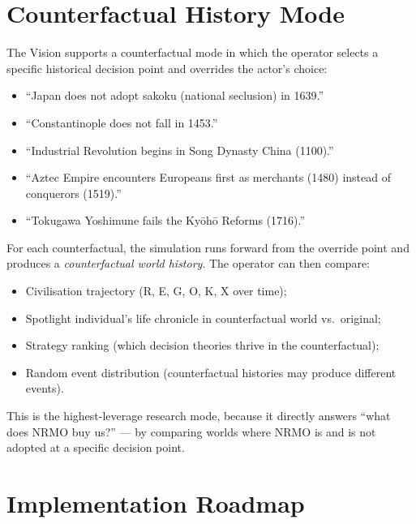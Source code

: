 \section{Counterfactual History Mode}
\label{sec:vision-counterfactual}

The Vision supports a counterfactual mode in which the operator selects
a specific historical decision point and overrides the actor's
choice:

\begin{itemize}
\item ``Japan does not adopt sakoku (national seclusion) in 1639.''
\item ``Constantinople does not fall in 1453.''
\item ``Industrial Revolution begins in Song Dynasty China (1100).''
\item ``Aztec Empire encounters Europeans first as merchants
(1480) instead of conquerors (1519).''
\item ``Tokugawa Yoshimune fails the Kyōhō Reforms (1716).''
\end{itemize}

For each counterfactual, the simulation runs forward from the override
point and produces a \emph{counterfactual world history}. The operator
can then compare:

\begin{itemize}
\item Civilisation trajectory (R, E, G, O, K, X over time);
\item Spotlight individual's life chronicle in counterfactual world
vs.\ original;
\item Strategy ranking (which decision theories thrive in the
counterfactual);
\item Random event distribution (counterfactual histories may produce
different events).
\end{itemize}

This is the highest-leverage research mode, because it directly
answers ``what does NRMO buy us?'' --- by comparing worlds where NRMO
is and is not adopted at a specific decision point.

\section{Implementation Roadmap}
\label{sec:vision-roadmap}

